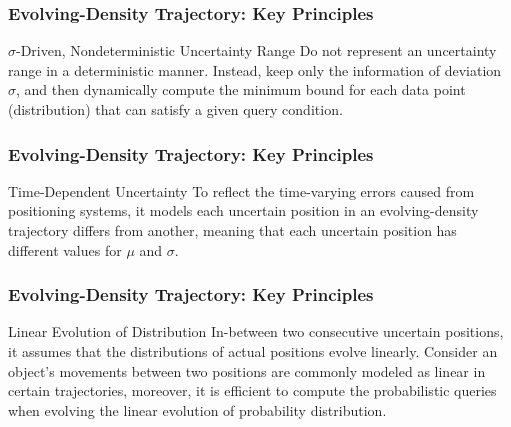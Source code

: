 
\begin{frame}
\frametitle{Evolving-Density Trajectory: Key Principles}

\begin{block}{$\sigma$-Driven, Nondeterministic Uncertainty Range}
  Do not represent an uncertainty range in a deterministic manner. Instead, keep only the information of deviation $\sigma$, and then dynamically compute the minimum bound for each data point (distribution) that can satisfy a given query condition.
\end{block}

\end{frame}


\begin{frame}
\frametitle{Evolving-Density Trajectory: Key Principles}

\begin{block}{Time-Dependent Uncertainty}
  To reflect the time-varying errors caused from positioning systems, it models each uncertain position in an evolving-density trajectory differs from another, meaning that each uncertain position has different values for $\mu$ and $\sigma$.
\end{block}

\end{frame}


\begin{frame}
\frametitle{Evolving-Density Trajectory: Key Principles}

\begin{block}{Linear Evolution of Distribution}
  In-between two consecutive uncertain positions, it assumes that the distributions of actual positions evolve linearly. Consider an object's movements between two positions are commonly modeled as linear in certain trajectories, moreover, it is efficient to compute the probabilistic queries when evolving the linear evolution of probability distribution.
\end{block}

\end{frame}


